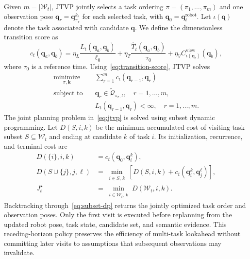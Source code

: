 \documentclass[letterpaper,10pt,journal]{IEEEtran}
\begin{document}
Given $m=|\mathcal W_t|$, JTVP jointly selects a task ordering $\pi=(\pi_1,\ldots,\pi_m)$ and one observation pose $\mathbf{q}_r=\mathbf{q}_{\pi_r}^{k_r}$ for each selected task, with $\mathbf{q}_0=\mathbf{q}_t^{\mathrm{robot}}$. Let $\iota(\mathbf{q})$ denote the task associated with candidate $\mathbf{q}$. We define the dimensionless transition score as
\begin{equation}
c_t(\mathbf{q}_a,\mathbf{q}_b)=
\eta_L\frac{L_t(\mathbf{q}_a,\mathbf{q}_b)}{\ell_0}
+\eta_T\frac{\widehat T_t(\mathbf{q}_a,\mathbf{q}_b)}{\tau_0}
+\eta_V C_{\iota(\mathbf{q}_b)}^{\mathrm{view}}(\mathbf{q}_b),
\label{eq:transition-score}
\end{equation}
where $\tau_0$ is a reference time. Using~\eqref{eq:transition-score}, JTVP solves
\begin{equation}
\begin{aligned}
\underset{\pi,\mathbf{k}}{\operatorname{minimize}}\quad
&\sum_{r=1}^{m}c_t(\mathbf{q}_{r-1},\mathbf{q}_r)\\
\operatorname{subject\ to}\quad
&\mathbf{q}_r\in\widetilde{\mathcal Q}_{\pi_r,t},\quad r=1,\ldots,m,\\
&L_t(\mathbf{q}_{r-1},\mathbf{q}_r)<\infty,\quad r=1,\ldots,m.
\end{aligned}
\label{eq:jtvp}
\end{equation}
The joint planning problem in~\eqref{eq:jtvp} is solved using subset dynamic programming. Let $D(S,i,k)$ be the minimum accumulated cost of visiting task subset $S\subseteq\mathcal W_t$ and ending at candidate $k$ of task $i$. Its initialization, recurrence, and terminal cost are
\begin{subequations}\label{eq:subset-dp}
\begin{align}
D(\{i\},i,k)&=c_t(\mathbf{q}_0,\mathbf{q}_i^k),
\label{eq:dp-init}\\
D(S\cup\{j\},j,\ell)&=
\min_{\substack{i\in S,\,k}}
\left[D(S,i,k)+c_t(\mathbf{q}_i^k,\mathbf{q}_j^\ell)\right],
\label{eq:dp-recurrence}\\
J_t^\star&=\min_{\substack{i\in\mathcal W_t,\,k}}
D(\mathcal W_t,i,k).
\label{eq:dp-terminal}
\end{align}
\end{subequations}
Backtracking through~\eqref{eq:subset-dp} returns the jointly optimized task order and observation poses. Only the first visit is executed before replanning from the updated robot pose, task state, candidate set, and semantic evidence. This receding-horizon policy preserves the efficiency of multi-task lookahead without committing later visits to assumptions that subsequent observations may invalidate.
\end{document}
